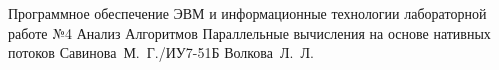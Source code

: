 \documentclass{bmstu}
\begin{document}
	
	{Программное обеспечение ЭВМ и информационные технологии}
	{лабораторной работе №4}
	{Анализ Алгоритмов}
	{Параллельные вычисления на основе нативных потоков}
	{}
	{Савинова~М.~Г./ИУ7-51Б}
	{Волкова~Л.~Л.}
	
	\maketableofcontents
	
	
	
	
	
	
	
	
	\makebibliography
	
	
	
\end{document}
